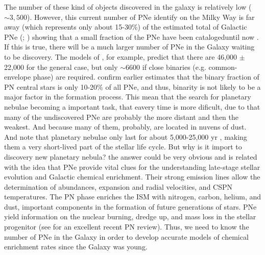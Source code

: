 \documentclass[fleqn,usenatbib]{mnras}
\begin{document}
The number of these kind of objects discovered in the galaxy is relatively low (\(\sim 3,500\)).
However, this current number of PNe identify on the Milky Way is far away (which represents
only about 15-30\%) of the estimated total of Galactic PNe (\citealp{Frew:2008}; \citealp{Jacoby:2010})
showing that a small fraction of the PNe have been catalogeduntil now \citep{Frew:2017}.
If this is true, there will be a much larger number of PNe in the Galaxy waiting to be discovery.
The models of \citet{Moe:2006}, for example, predict that there are 46,000 $\pm$ 22,000
for the general case, but only $\sim$6600 \citep{Marco:2005} if close binaries
(e.g. common-envelope phase) are required. \citet{Miszalski:2009} confirm earlier estimates
that the binary fraction of PN central stars is only 10-20\% of all
PNe, and thus, binarity is not likely to be a major factor in
the formation process. This mean that the search for planetary nebulae
becoming a important task, that eavery time is more dificult, due to that many of
the undiscovered PNe are probably the more distant and then the weakest.
And because many of them, probably, are located in nuvens of dust.
And note that planetary nebulae only last for about 5,000-25,000 yr \citep{Badenes:2015},
making them a very short-lived part of the stellar life cycle.
But why is it import to discovery new planetary nebula? the answer could be very obvious and is
related with the idea that PNe provide vital clues for the understanding late-stage stellar
evolution and Galactic chemical enrichment. Their strong emission lines allow the determination
of abundances, expansion and radial velocities, and
CSPN temperatures. The PN phase enriches the ISM with nitrogen, carbon, helium,
and dust, important components in the formation of future
generations of stars. PNe yield information on the nuclear
burning, dredge up, and mass loss in the stellar progenitor
(see \citealp{Kwitter:2022} for an excellent recent PN
review). Thus, we need to know the number of PNe in
the Galaxy in order to develop accurate models of 
chemical enrichment rates since the Galaxy was young.
\end{document}

